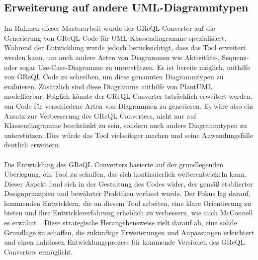 \subsection{Erweiterung auf andere UML-Diagrammtypen}

Im Rahmen dieser Masterarbeit wurde der GReQL Converter auf die Generierung von GReQL-Code für UML-Klassendiagramme
spezialisiert. Während der Entwicklung wurde jedoch berücksichtigt, dass das Tool erweitert werden kann, um auch andere
Arten von Diagrammen wie Aktivitäts-, Sequenz- oder sogar Use-Case-Diagramme zu unterstützen. Es ist bereits möglich,
mithilfe von GReQL Code zu schreiben, um diese genannten Diagrammtypen zu evaluieren. Zusätzlich sind diese Diagramme
mithilfe von PlantUML modellierbar. Folglich könnte der GReQL Converter tatsächlich erweitert werden, um Code für
verschiedene Arten von Diagrammen zu generieren. Es wäre also ein Ansatz zur Verbesserung des GReQL Converters, nicht
nur auf Klassendiagramme beschränkt zu sein, sondern auch andere Diagrammtypen zu unterstützen. Dies würde das Tool
vielseitiger machen und seine Anwendungsfälle deutlich erweitern.
\\~\\

Die Entwicklung des GReQL Converters basierte auf der grundlegenden Überlegung, ein Tool zu schaffen, das sich
kontinuierlich weiterentwickeln kann. Dieser Aspekt fand sich in der Gestaltung des Codes wider, der gemäß etablierter
Designprinzipien und bewährter Praktiken verfasst wurde. Der Fokus lag darauf, kommenden Entwicklern, die an diesem Tool
arbeiten, eine klare Orientierung zu bieten und ihre Entwicklererfahrung erheblich zu verbessern, wie auch McConnell es
erwähnt~\cite{mcconnell2006software}. Diese strategische Herangehensweise zielt darauf ab, eine solide Grundlage zu
schaffen, die zukünftige Erweiterungen und Anpassungen erleichtert und einen nahtlosen Entwicklungsprozess für kommende
Versionen des GReQL Converters ermöglicht.

